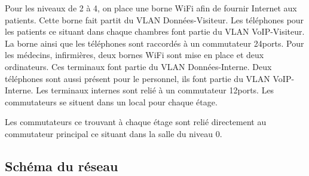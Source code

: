 Pour les niveaux de 2 à 4, on place une borne WiFi afin de fournir Internet aux patients.
Cette borne fait partit du VLAN Données-Visiteur. Les téléphones pour les patients ce situant dans chaque chambres font partie du VLAN VoIP-Visiteur.
La borne ainsi que les téléphones sont raccordés à un commutateur 24ports.
Pour les médecins, infirmières, deux bornes WiFi sont mise en place et deux ordinateurs.
Ces terminaux font partie du VLAN Données-Interne. Deux téléphones sont aussi présent pour le personnel, ils font partie du VLAN VoIP-Interne.
Les terminaux internes sont relié à un commutateur 12ports.
Les commutateurs se situent dans un local pour chaque étage.

Les commutateurs ce trouvant à chaque étage sont relié directement au commutateur principal ce situant dans la salle du niveau 0.

%
%
\subsection{Schéma du réseau}


%
%
